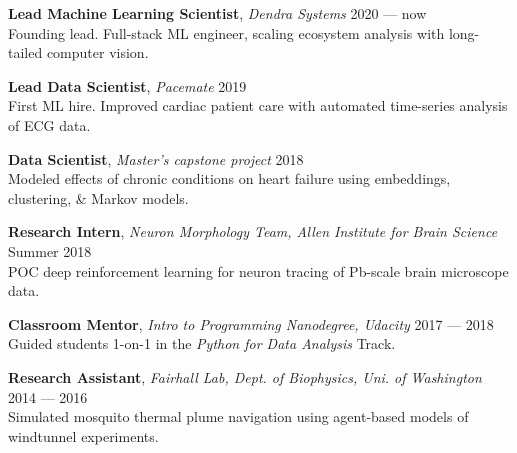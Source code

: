 \documentclass[a4paper,12pt]{article}
\newcommand{\resheading}[1]{{\vspace*{.001in} \colorbox{mygrey}{\begin{minipage}{\textwidth}{\textmd{\large \textbf{#1} \vphantom{p\^{E}}}}\end{minipage}}} }
\newcommand{\ressubheading}[4]{
    \textbf{#1} \hfill #2\\
    \textit{#3} \hfill #4 \\}
\begin{document}
    {\setlength{\parskip}{8pt}

    \textbf{Lead Machine Learning Scientist}, \textit{Dendra Systems} \hfill 2020 --- now \\
    Founding lead. Full-stack ML engineer, scaling ecosystem analysis with long-tailed computer vision.


    \textbf{Lead Data Scientist}, \textit{Pacemate} \hfill 2019 \\
    First ML hire. Improved cardiac patient care with automated time-series analysis of ECG data.

    \textbf{Data Scientist}, \textit{Master's capstone project} \hfill 2018\\
    Modeled effects of chronic conditions on heart failure using embeddings, clustering, \& Markov models.

    \textbf{Research Intern}, \textit{Neuron Morphology Team, Allen Institute for Brain Science} \hfill Summer 2018\\
    POC deep reinforcement learning for neuron tracing of Pb-scale brain microscope data.


    \textbf{Classroom Mentor}, \textit{Intro to Programming Nanodegree, Udacity} \hfill 2017 --- 2018\\
    Guided students 1-on-1 in the \textit{Python for Data Analysis} Track.

    \textbf{Research Assistant}, \textit{Fairhall Lab, Dept. of Biophysics, Uni. of Washington} \hfill 2014 --- 2016\\
    Simulated mosquito thermal plume navigation using agent-based models of windtunnel experiments.\\


    }
%
%
\end{document}
